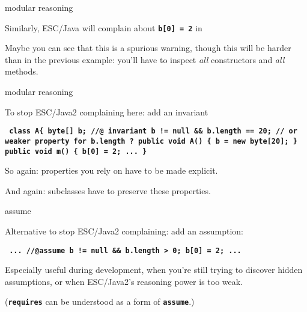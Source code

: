 \documentclass[
pdf,
nocolorBG,
slideColor,
erik,
]{prosper}
\newcommand{\code}[1]{{\rm \texttt{\textbf{\small #1}}}}
\begin{document}
\begin{slide}{modular reasoning}
\vspace*{-4ex}

Similarly, ESC/Java will complain about \code{b[0] = 2} in

Maybe you can see that this is a spurious warning, though this will be
harder than in the previous example: you'll have to inspect {\em all}
constructors and {\em all} methods.

\end{slide}

\begin{slide}{modular reasoning}
\vspace*{-4ex}

To stop ESC/Java2 complaining here: add an invariant

\begin{alltt}\code{ class A\{
  byte[] b;
  {\green //@ invariant b != null && b.length == 20;}
  {\green     // or weaker property for b.length ?}
  public void A() \{ b = new byte[20]; \}
  public void m() \{ b[0] = 2;
                    ...  \}
}
\end{alltt} %

So again: properties you rely on have to be made explicit.

\medskip

And again: subclasses have to preserve these properties.

\end{slide}


\begin{slide}{assume}
\vspace*{-4ex}

Alternative to stop ESC/Java2 complaining: add an assumption:
\begin{alltt}\code{ 
    ...
    //@{\blue assume} b != null && b.length > 0;
    b[0] = 2;
    ...  
}
\end{alltt}

Especially useful during development, when you're still trying to
discover hidden assumptions, or when ESC/Java2's reasoning power is
too weak.

\medskip

(\code{requires} can be understood as a form of \code{assume}.)

\end{slide}
\end{document}
